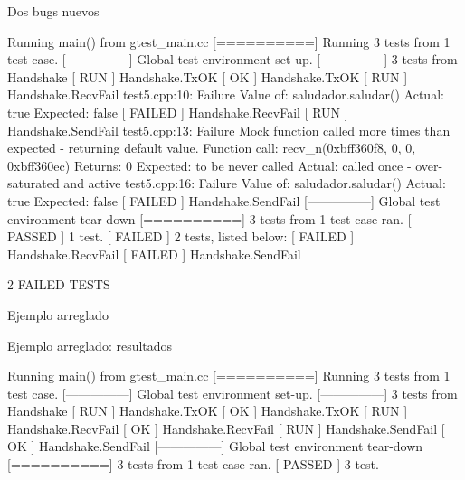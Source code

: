 \begin{frame}{Dos bugs nuevos}
\begin{semiverbatim}
Running main() from gtest_main.cc
{\color[rgb]{0,1,0}[==========]} Running 3 tests from 1 test case.
{\color[rgb]{0,1,0}[---------------]} Global test environment set-up.
{\color[rgb]{0,1,0}[---------------]} 3 tests from Handshake
{\color[rgb]{0,1,0}[ RUN      ]} Handshake.TxOK
{\color[rgb]{0,1,0}[       OK ]} Handshake.TxOK
{\color[rgb]{0,1,0}[ RUN      ]} Handshake.RecvFail
test5.cpp:10: Failure
Value of: saludador.saludar()
  Actual: true
Expected: false
{\color[rgb]{1,0,0}[  FAILED  ]} Handshake.RecvFail
{\color[rgb]{0,1,0}[ RUN      ]} Handshake.SendFail
test5.cpp:13: Failure
Mock function called more times than expected - returning default value.
    Function call: recv_n(0xbff360f8, 0, 0, 0xbff360ec)
          Returns: 0
         Expected: to be never called
           Actual: called once - over-saturated and active
test5.cpp:16: Failure
Value of: saludador.saludar()
  Actual: true
Expected: false
{\color[rgb]{1,0,0}[  FAILED  ]} Handshake.SendFail
{\color[rgb]{0,1,0}[---------------]} Global test environment tear-down
{\color[rgb]{0,1,0}[==========]} 3 tests from 1 test case ran.
{\color[rgb]{0,1,0}[  PASSED  ]} 1 test.
{\color[rgb]{1,0,0}[  FAILED  ]} 2 tests, listed below:
{\color[rgb]{1,0,0}[  FAILED  ]} Handshake.RecvFail
{\color[rgb]{1,0,0}[  FAILED  ]} Handshake.SendFail

 2 FAILED TESTS
\end{semiverbatim}
\end{frame}



\begin{frame}[shrink]{Ejemplo arreglado}

\end{frame}


\begin{frame}{Ejemplo arreglado: resultados}
\begin{semiverbatim}
Running main() from gtest_main.cc
{\color[rgb]{0,1,0}[==========]} Running 3 tests from 1 test case.
{\color[rgb]{0,1,0}[---------------]} Global test environment set-up.
{\color[rgb]{0,1,0}[---------------]} 3 tests from Handshake
{\color[rgb]{0,1,0}[ RUN      ]} Handshake.TxOK
{\color[rgb]{0,1,0}[       OK ]} Handshake.TxOK
{\color[rgb]{0,1,0}[ RUN      ]} Handshake.RecvFail
{\color[rgb]{0,1,0}[       OK ]} Handshake.RecvFail
{\color[rgb]{0,1,0}[ RUN      ]} Handshake.SendFail
{\color[rgb]{0,1,0}[       OK ]} Handshake.SendFail
{\color[rgb]{0,1,0}[---------------]} Global test environment tear-down
{\color[rgb]{0,1,0}[==========]} 3 tests from 1 test case ran.
{\color[rgb]{0,1,0}[  PASSED  ]} 3 test.
\end{semiverbatim}
\end{frame}
